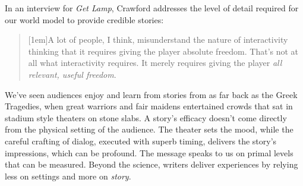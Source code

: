 In an interview for \textit{Get Lamp}, Crawford addresses\label{link:extent_model} the level of detail required for our world model
to provide credible stories:
\begin{quote}
[1em]A lot of people, I think, mis\textendash understand the nature of interactivity thinking that it requires giving the player absolute freedom. That's not at all what interactivity requires. It merely requires giving the player \textit{all relevant, useful freedom}.
\end{quote}
We've seen audiences enjoy and learn
from stories from as far back as the Greek
Tragedies, when great warriors and fair maidens entertained crowds that sat in
stadium style theaters on stone slabs. A story's efficacy doesn't come directly
from the physical setting of the audience. The theater sets the mood, while the
careful crafting of dialog, executed with superb timing, delivers the story's
impressions, which can be profound. The message speaks to us on primal levels
that
 can be measured. Beyond the science,
writers deliver experiences by relying less on settings and more on \textit{story}.

